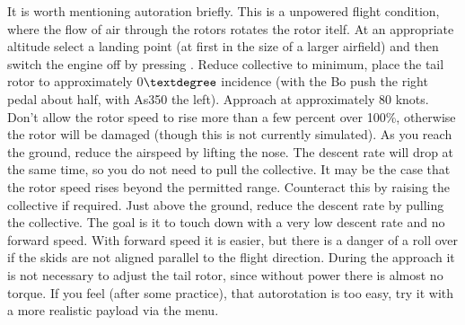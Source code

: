 It is worth mentioning autoration briefly. This is a unpowered flight condition, 
where the flow of air through the rotors rotates the rotor itelf. At an 
appropriate altitude select a landing point (at first in the size of a larger 
airfield) and then switch the engine off by pressing \key{\{}. Reduce 
collective to minimum, place the tail rotor to approximately 0$\textdegree$ 
incidence (with the Bo push the right pedal about half, with As350 the left). 
Approach at approximately 80 knots. Don't allow the rotor speed to rise more 
than a few percent over 100\%, otherwise the rotor will be damaged (though 
this is not currently simulated). As you reach the ground, reduce the airspeed 
by lifting the nose. The descent rate will drop at the same time, so you do 
not need to pull the collective. It may be the case that the rotor speed 
rises beyond the permitted range. Counteract this by raising the collective 
if required. Just above the ground, reduce the descent rate by pulling the 
collective. The goal is it to touch down with a very low descent rate and no 
forward speed. With forward speed it is easier, but there is a danger of a 
roll over if the skids are not aligned parallel to the flight direction. 
During the approach it is not necessary to adjust the tail rotor, since 
without power there is almost no torque. If you feel (after some practice), 
that autorotation is too easy, try it with a more realistic payload via 
the  menu. 

\fi












